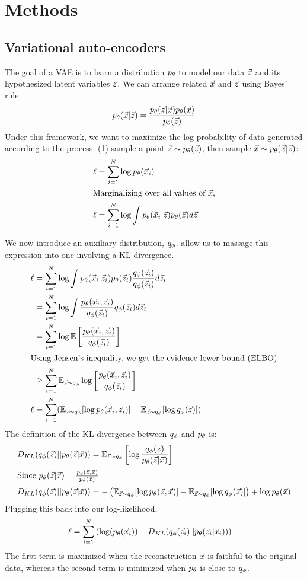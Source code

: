 \section{Methods}

\subsection{Variational auto-encoders}

The goal of a VAE is to learn a distribution $p_\theta$ to model our data $\vec{x}$ and its hypothesized latent variables $\vec{z}$. We can arrange related $\vec{x}$ and $\vec{z}$ using Bayes' rule:
\begin{equation*}
    p_\theta(\vec{x}|\vec{z}) = \frac{p_\theta(\vec{z}|\vec{x})p_\theta(\vec{x})}{p_\theta(\vec{z})}
\end{equation*}
Under this framework, we want to maximize the log-probability of data generated according to the process: (1) sample a point $\vec{z}\sim p_\theta(\vec{z})$, then sample $\vec{x}\sim p_\theta(\vec{x}|\vec{z})$:
\begin{align*}
    \ell &=\sum_{i=1}^N\log p_\theta(\vec{x}_i) \\
    \intertext{Marginalizing over all values of $\vec{x}$,}
    \ell&=\sum_{i=1}^N\log\int p_\theta(\vec{x}_i|\vec{z})p_\theta(\vec{z})d\vec{z}
\end{align*}


We now introduce an auxiliary distribution, $q_\phi$.  allow us to massage this expression into one involving a KL-divergence.
\begin{align*}
    \ell &= \sum_{i=1}^N\log\int p_\theta(\vec{x}_i|\vec{z}_i)p_\theta(\vec{z}_i)\frac{q_\phi(\vec{z}_i)}{q_\phi(\vec{z}_i)}d\vec{z}_i \\
    &= \sum_{i=1}^N\log\int\frac{p_\theta(\vec{x}_i,\vec{z}_i)}{q_\phi(\vec{z}_i)}q_\phi(\vec{z}_i)d\vec{z}_i \\
    &= \sum_{i=1}^N\log\mathbb{E}\left[\frac{p_\theta(\vec{x}_i,\vec{z}_i)}{q_\phi(\vec{z}_i)}\right] \\
    \intertext{Using Jensen's inequality, we get the evidence lower bound (ELBO)}
    &\geq \sum_{i=1}^N\mathbb{E}_{\vec{z}\sim q_\phi}\log\left[\frac{p_\theta(\vec{x}_i,\vec{z}_i)}{q_\phi(\vec{z}_i)}\right] \\
    \ell &= \sum_{i=1}^N(\mathbb{E}_{\vec{z}\sim q_\phi}[\log p_\theta(\vec{x}_i, \vec{z}_i)] - \mathbb{E}_{\vec{z}\sim q_\phi}[\log q_\phi(\vec{z})])
\end{align*}
The definition of the KL divergence between $q_\phi$ and $p_\theta$ is:
\begin{align*}
    D_{KL}(q_\phi(\vec{z})||p_\theta(\vec{z}|\vec{x})) &= \mathbb{E}_{\vec{z}\sim q_\phi}\left[ \log\frac{q_\phi(\vec{z})}{p_\theta(\vec{z}|\vec{x})} \right] \\
    \intertext{Since $p_\theta(\vec{z}|\vec{x}) = \frac{p_\theta(\vec{z},\vec{x})}{p_\theta(\vec{x})}$}
    D_{KL}(q_\phi(\vec{z})||p_\theta(\vec{z}|\vec{x})) &= -\left( \mathbb{E}_{\vec{z}\sim q_\phi}[\log p_\theta(\vec{z},\vec{x})] - \mathbb{E}_{\vec{z}\sim q_\phi}[\log q_\phi(\vec{z})]\right) + \log p_\theta(\vec{x})
\end{align*}
Plugging this back into our log-likelihood,
\begin{align*}
    \ell &= \sum_{i=1}^N\left( \log(p_\theta(\vec{x}_i)) - D_{KL}(q_\phi(\vec{z}_i)||p_\theta(\vec{z}_i|\vec{x}_i)) \right)
\end{align*}
The first term is maximized when the reconstruction $\vec{x}$ is faithful to the original data, whereas the second term is minimized when $p_\theta$ is close to $q_\phi$.

